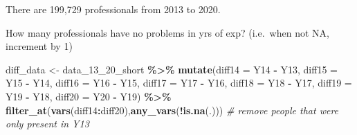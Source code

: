 \documentclass[
]{article}
\newenvironment{Shaded}{\begin{snugshade}}{\end{snugshade}}
\newcommand{\CommentTok}[1]{\textcolor[rgb]{0.56,0.35,0.01}{\textit{#1}}}
\newcommand{\DataTypeTok}[1]{\textcolor[rgb]{0.13,0.29,0.53}{#1}}
\newcommand{\DecValTok}[1]{\textcolor[rgb]{0.00,0.00,0.81}{#1}}
\newcommand{\KeywordTok}[1]{\textcolor[rgb]{0.13,0.29,0.53}{\textbf{#1}}}
\newcommand{\NormalTok}[1]{#1}
\newcommand{\OperatorTok}[1]{\textcolor[rgb]{0.81,0.36,0.00}{\textbf{#1}}}
\newcommand{\OtherTok}[1]{\textcolor[rgb]{0.56,0.35,0.01}{#1}}
\newcommand{\StringTok}[1]{\textcolor[rgb]{0.31,0.60,0.02}{#1}}
\begin{document}
There are 199,729 professionals from 2013 to 2020.

How many professionals have no problems in yrs of exp? (i.e.~when not
NA, increment by 1)

\begin{Shaded}
\begin{Highlighting}[]
\NormalTok{diff\_data \textless{}{-}}\StringTok{ }\NormalTok{data\_}\DecValTok{13}\NormalTok{\_}\DecValTok{20}\NormalTok{\_short }\OperatorTok{\%\textgreater{}\%}
\StringTok{  }\KeywordTok{mutate}\NormalTok{(}\DataTypeTok{diff14 =}\NormalTok{ Y14 }\OperatorTok{{-}}\StringTok{ }\NormalTok{Y13,}
         \DataTypeTok{diff15 =}\NormalTok{ Y15 }\OperatorTok{{-}}\StringTok{ }\NormalTok{Y14,}
         \DataTypeTok{diff16 =}\NormalTok{ Y16 }\OperatorTok{{-}}\StringTok{ }\NormalTok{Y15,}
         \DataTypeTok{diff17 =}\NormalTok{ Y17 }\OperatorTok{{-}}\StringTok{ }\NormalTok{Y16,}
         \DataTypeTok{diff18 =}\NormalTok{ Y18 }\OperatorTok{{-}}\StringTok{ }\NormalTok{Y17,}
         \DataTypeTok{diff19 =}\NormalTok{ Y19 }\OperatorTok{{-}}\StringTok{ }\NormalTok{Y18,}
         \DataTypeTok{diff20 =}\NormalTok{ Y20 }\OperatorTok{{-}}\StringTok{ }\NormalTok{Y19) }\OperatorTok{\%\textgreater{}\%}
\StringTok{  }\KeywordTok{filter\_at}\NormalTok{(}\KeywordTok{vars}\NormalTok{(diff14}\OperatorTok{:}\NormalTok{diff20),}\KeywordTok{any\_vars}\NormalTok{(}\OperatorTok{!}\KeywordTok{is.na}\NormalTok{(.))) }\CommentTok{\# remove people that were only present in Y13}
\end{Highlighting}
\end{Shaded}

\begin{Shaded}
\end{Shaded}
\end{document}
